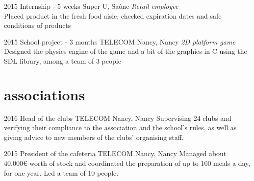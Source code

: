 \documentclass[]{lemaki-cv}
\begin{document}
\begin{entrylist}

		\entry
		{2015}
		{Internship {\normalfont - 5 weeks}}
		{Super U, Saône}
		{\emph{Retail employee} \\
		Placed product in the fresh food aisle, checked expiration dates and safe conditions of products}


		\entry
		{2015}
		{School project {\normalfont - 3 months}}
		{TELECOM Nancy, Nancy}
		{\emph{2D platform game} \\
		Designed the physics engine of the game and a bit of the graphics in C using
		the SDL library, among a team of 3 people}


	\end{entrylist}

	\clearpage


	\section{associations}

	\begin{entrylist}


		\entry
		{2016}
		{Head of the clubs}
		{TELECOM Nancy, Nancy}
		{Supervising 24 clubs and verifying their compliance to the association and
		the school's rules, as well as giving advice to new members of the clubs'
		organising staff.}


		\entry
		{2015}
		{President of the cafeteria}
		{TELECOM Nancy, Nancy}
		{Managed about 40.000€ worth of stock and coordinated the preparation of up
		to 100 meals a day, for one year. Led a team of 10 people.}


	\end{entrylist}

\end{document}

